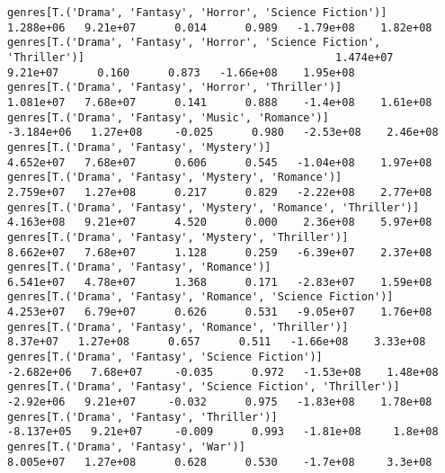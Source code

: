 \documentclass[11pt]{article}
\begin{document}
\begin{Verbatim}[commandchars=\\\{\}]
genres[T.('Drama', 'Fantasy', 'Horror', 'Science Fiction')]                                                   1.288e+06   9.21e+07      0.014      0.989   -1.79e+08    1.82e+08
genres[T.('Drama', 'Fantasy', 'Horror', 'Science Fiction', 'Thriller')]                                       1.474e+07   9.21e+07      0.160      0.873   -1.66e+08    1.95e+08
genres[T.('Drama', 'Fantasy', 'Horror', 'Thriller')]                                                          1.081e+07   7.68e+07      0.141      0.888    -1.4e+08    1.61e+08
genres[T.('Drama', 'Fantasy', 'Music', 'Romance')]                                                           -3.184e+06   1.27e+08     -0.025      0.980   -2.53e+08    2.46e+08
genres[T.('Drama', 'Fantasy', 'Mystery')]                                                                     4.652e+07   7.68e+07      0.606      0.545   -1.04e+08    1.97e+08
genres[T.('Drama', 'Fantasy', 'Mystery', 'Romance')]                                                          2.759e+07   1.27e+08      0.217      0.829   -2.22e+08    2.77e+08
genres[T.('Drama', 'Fantasy', 'Mystery', 'Romance', 'Thriller')]                                              4.163e+08   9.21e+07      4.520      0.000    2.36e+08    5.97e+08
genres[T.('Drama', 'Fantasy', 'Mystery', 'Thriller')]                                                         8.662e+07   7.68e+07      1.128      0.259   -6.39e+07    2.37e+08
genres[T.('Drama', 'Fantasy', 'Romance')]                                                                     6.541e+07   4.78e+07      1.368      0.171   -2.83e+07    1.59e+08
genres[T.('Drama', 'Fantasy', 'Romance', 'Science Fiction')]                                                  4.253e+07   6.79e+07      0.626      0.531   -9.05e+07    1.76e+08
genres[T.('Drama', 'Fantasy', 'Romance', 'Thriller')]                                                          8.37e+07   1.27e+08      0.657      0.511   -1.66e+08    3.33e+08
genres[T.('Drama', 'Fantasy', 'Science Fiction')]                                                            -2.682e+06   7.68e+07     -0.035      0.972   -1.53e+08    1.48e+08
genres[T.('Drama', 'Fantasy', 'Science Fiction', 'Thriller')]                                                 -2.92e+06   9.21e+07     -0.032      0.975   -1.83e+08    1.78e+08
genres[T.('Drama', 'Fantasy', 'Thriller')]                                                                   -8.137e+05   9.21e+07     -0.009      0.993   -1.81e+08     1.8e+08
genres[T.('Drama', 'Fantasy', 'War')]                                                                         8.005e+07   1.27e+08      0.628      0.530    -1.7e+08     3.3e+08

\end{Verbatim}
\end{document}
